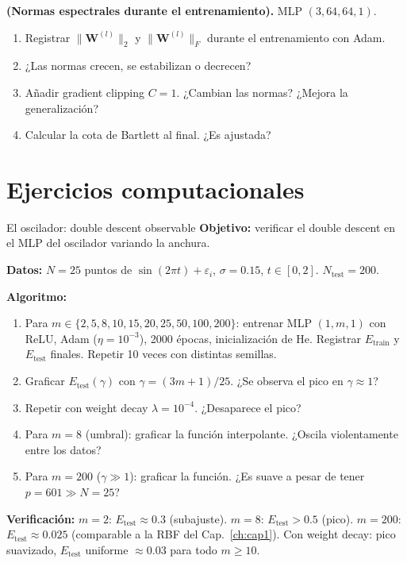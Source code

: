 \begin{ejercicio}
\textbf{(Normas espectrales durante el entrenamiento).}
MLP $(3, 64, 64, 1)$.
\begin{enumerate}[label=(\alph*)]
  \item Registrar $\|\bm{W}^{(l)}\|_2$ y $\|\bm{W}^{(l)}\|_F$
        durante el entrenamiento con Adam.
  \item ¿Las normas crecen, se estabilizan o decrecen?
  \item Añadir gradient clipping $C = 1$. ¿Cambian las normas?
        ¿Mejora la generalización?
  \item Calcular la cota de Bartlett al final. ¿Es ajustada?
\end{enumerate}
\end{ejercicio}

\section*{Ejercicios computacionales}

\begin{ejerciciocomp}{El oscilador: double descent observable}
\label{ejcomp:oscilador8}
\textbf{Objetivo:} verificar el double descent en el MLP del oscilador
variando la anchura.

\medskip\noindent\textbf{Datos:}
$N = 25$ puntos de $\sin(2\pi t)+\varepsilon_i$, $\sigma = 0.15$,
$t \in [0,2]$. $N_{\text{test}} = 200$.

\medskip\noindent\textbf{Algoritmo:}
\begin{enumerate}
  \item Para $m \in \{2, 5, 8, 10, 15, 20, 25, 50, 100, 200\}$:
        entrenar MLP $(1, m, 1)$ con ReLU, Adam ($\eta = 10^{-3}$),
        2000 épocas, inicialización de He. Registrar
        $E_{\text{train}}$ y $E_{\text{test}}$ finales.
        Repetir 10 veces con distintas semillas.
  \item Graficar $E_{\text{test}}(\gamma)$ con $\gamma = (3m+1)/25$.
        ¿Se observa el pico en $\gamma \approx 1$?
  \item Repetir con weight decay $\lambda = 10^{-4}$. ¿Desaparece
        el pico?
  \item Para $m = 8$ (umbral): graficar la función interpolante.
        ¿Oscila violentamente entre los datos?
  \item Para $m = 200$ ($\gamma \gg 1$): graficar la función.
        ¿Es suave a pesar de tener $p = 601 \gg N = 25$?
\end{enumerate}

\medskip\noindent\textbf{Verificación:}
$m = 2$: $E_{\text{test}} \approx 0.3$ (subajuste).
$m = 8$: $E_{\text{test}} > 0.5$ (pico).
$m = 200$: $E_{\text{test}} \approx 0.025$ (comparable a la RBF del
Cap.~\ref{ch:cap1}).
Con weight decay: pico suavizado, $E_{\text{test}}$ uniforme
$\approx 0.03$ para todo $m \geq 10$.
\end{ejerciciocomp}

